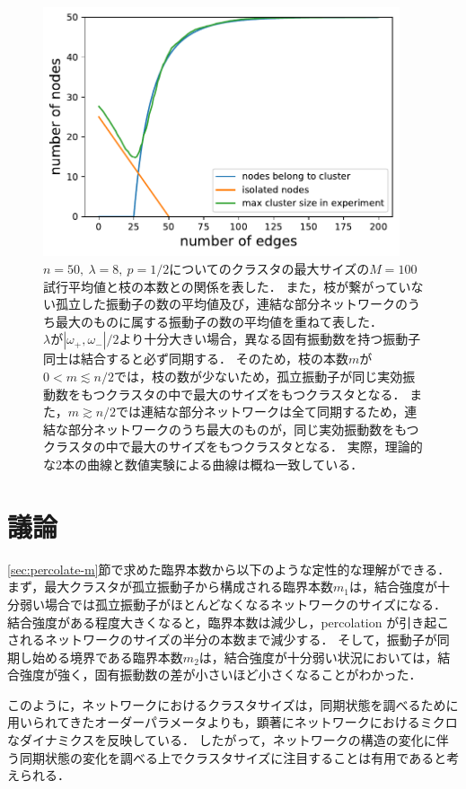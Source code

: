 \documentclass[../main]{subfiles}
\begin{document}
\begin{figure}[tbp]
\centering
\includegraphics[width=105mm]{./images/edge-finite-maxsize-delta000038000-compare.pdf}
\centering
\caption{$n=50,\ \lambda=8,\ p=1/2$についてのクラスタの最大サイズの$M=100$試行平均値と枝の本数との関係を表した．
また，枝が繋がっていない孤立した振動子の数の平均値及び，連結な部分ネットワークのうち最大のものに属する振動子の数の平均値を重ねて表した．\\
$\lambda$が$|\omega_+,\omega_-|/2$より十分大きい場合，異なる固有振動数を持つ振動子同士は結合すると必ず同期する．
そのため，枝の本数$m$が$0<m\lesssim n/2$では，枝の数が少ないため，孤立振動子が同じ実効振動数をもつクラスタの中で最大のサイズをもつクラスタとなる．
また，$m\gtrsim n/2$では連結な部分ネットワークは全て同期するため，連結な部分ネットワークのうち最大のものが，同じ実効振動数をもつクラスタの中で最大のサイズをもつクラスタとなる．
実際，理論的な2本の曲線と数値実験による曲線は概ね一致している．}
\label{fig:edge-cutting-K8-maxsize}
\end{figure}

\section{議論}
\ref{sec:percolate-m}節で求めた臨界本数から以下のような定性的な理解ができる．
まず，最大クラスタが孤立振動子から構成される臨界本数$m_1$は，結合強度が十分弱い場合では孤立振動子がほとんどなくなるネットワークのサイズになる．
結合強度がある程度大きくなると，臨界本数は減少し，percolation が引き起こされるネットワークのサイズの半分の本数まで減少する．
そして，振動子が同期し始める境界である臨界本数$m_2$は，結合強度が十分弱い状況においては，結合強度が強く，固有振動数の差が小さいほど小さくなることがわかった．

このように，ネットワークにおけるクラスタサイズは，同期状態を調べるために用いられてきたオーダーパラメータよりも，顕著にネットワークにおけるミクロなダイナミクスを反映している．
したがって，ネットワークの構造の変化に伴う同期状態の変化を調べる上でクラスタサイズに注目することは有用であると考えられる．
\end{document}

